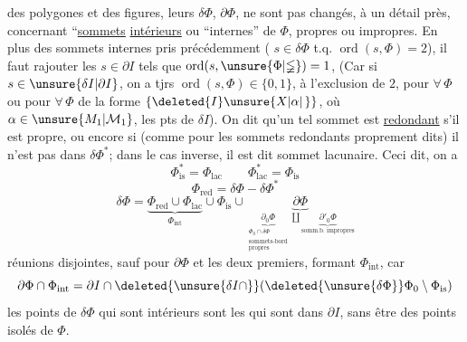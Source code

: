 
des polygones et des figures, leurs $\delta\Phi$, $\partial\Phi$, ne sont pas changés, à un détail près, concernant   ``\uline{sommets} \uline{intérieurs}  ou ``internes'' de $\Phi$, propres ou impropres. En plus des sommets internes pris précédemment ( $s\in\delta\Phi$ t.q. $\operatorname{ord}(s,\Phi)=2$), il faut rajouter les  $s\in\partial I$ tels que $\operatorname{ord}(s,\unsure{\Phi|\mathbb{\Phi}})=1$,  (Car si $s\in\unsure{\delta I|\partial I}$, on a tjrs $\operatorname{ord}(s,\Phi)\in\{0,1\}$, à l'exclusion de  $2$,   pour $\forall\,\Phi$ ou pour $\forall\,\Phi$ de la forme $\{\deleted{I}\unsure{X|\alpha|\,}\}$, où $\alpha\in\unsure{M_1|\mathcal M_1}$,  les pts de $\delta I$). On dit qu'un tel sommet est  \uline{redondant} s'il est propre, ou encore si (comme pour les sommets redondants proprement dits) il n'est pas dans $\delta\Phi^*$; dans le cas inverse, il est dit sommet lacunaire. Ceci dit, on a
\[
\Phi^*_{\mathrm{is}}=\Phi_{\mathrm{lac}}\qquad \Phi^*_{\mathrm{lac}}=\Phi_{\mathrm{is}}
\]
\[
\Phi_{\mathrm{red}}=\delta\Phi-\delta\Phi^*
\]
\[
\delta\Phi=\underbrace{\Phi_{\mathrm{red}}\cup\Phi_{\mathrm{lac}}}_{\Phi_{\mathrm{int}}}\cup\Phi_{\mathrm{is}}\cup
\underbrace{\partial\Phi}_{
 \underbrace{\partial_0\Phi}_{\substack{\Phi_0\cap\delta\Phi\\\text{sommets-bord}\\\text{propres}}}
 \amalg
 \underbrace{\partial'_0\Phi}_{\text{somm.b. impropres}}}
\]
réunions disjointes, sauf pour  $\partial\Phi$ et les deux premiers, formant $\Phi_{\mathrm{int}}$, car
\[
\partial\Phi\cap\Phi_{\mathrm{int}}=\partial I\cap\deleted{\unsure{\delta I\cap}}(\deleted{\unsure{\delta\Phi}}\Phi_0\setminus\Phi_{\mathrm{is}})
\]
les points de $\delta\Phi$ qui sont intérieurs sont les  qui sont dans $\partial I$, sans être des points isolés de $\Phi$.

